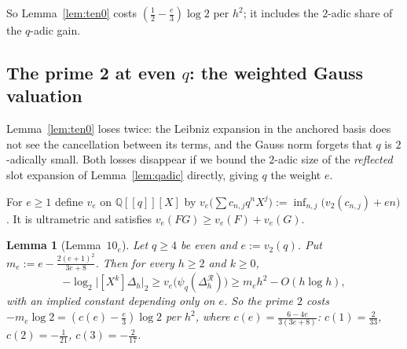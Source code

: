 \documentclass[11pt]{amsart}
\newtheorem{lemma}[theorem]{Lemma}
\theoremstyle{definition}
\theoremstyle{remark}
\numberwithin{equation}{section}
\newcommand{\QQ}{\mathbb{Q}}
\newcommand{\cR}{\mathcal{R}}
\begin{document}
So Lemma~\ref{lem:ten0} costs $(\frac12-\frac e3)\log2$ per $h^2$; it includes the $2$-adic share of the $q$-adic gain.

\subsection{The prime 2 at even \texorpdfstring{$q$}{q}: the weighted Gauss valuation}
Lemma~\ref{lem:ten0} loses twice: the Leibniz expansion in the anchored basis does not see the cancellation between its
terms, and the Gauss norm forgets that $q$ is $2$-adically small. Both losses disappear if we bound the $2$-adic size of the
\emph{reflected} slot expansion of Lemma~\ref{lem:qadic} directly, giving $q$ the weight $e$.

For $e\ge1$ define $v_e$ on $\QQ[[q]][X]$ by $v_e\bigl(\sum c_{n,j}q^nX^j\bigr):=\inf_{n,j}\bigl(v_2(c_{n,j})+en\bigr)$. It is
ultrametric and satisfies $v_e(FG)\ge v_e(F)+v_e(G)$.

\begin{lemma}[Lemma~$10_e$]\label{lem:tene}
Let $q\ge4$ be even and $e:=v_2(q)$. Put $m_e:=e-\frac{2(e+1)^2}{3e+8}$. Then for every $h\ge2$ and $k\ge0$,
\[
  -\log_2\bigl|[X^k]\Delta_h\bigr|_2\ge v_e\bigl(\psi_q(\Delta^{\cR}_h)\bigr)\ge m_eh^2-O(h\log h),
\]
with an implied constant depending only on $e$. So the prime $2$ costs $-m_e\log2=(c(e)-\frac e3)\log2$ per $h^2$, where
$c(e)=\frac{6-4e}{3(3e+8)}$: $c(1)=\frac2{33}$, $c(2)=-\frac1{21}$, $c(3)=-\frac2{17}$.
\end{lemma}
\end{document}
